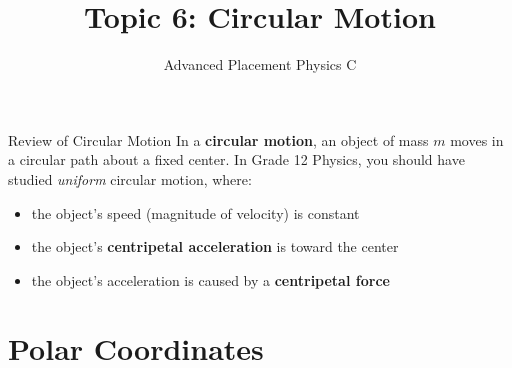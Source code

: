\documentclass[12pt,compress,aspectratio=169]{beamer}
\title{Topic 6: Circular Motion}
\subtitle{Advanced Placement Physics C}
\begin{document}
\begin{frame}
  \maketitle
\end{frame}



\begin{frame}{Review of Circular Motion}
  In a \textbf{circular motion}, an object of mass $m$ moves in a circular path
  about a fixed center. In Grade 12 Physics, you should have studied
  \emph{uniform} circular motion, where:
  \begin{itemize}
  \item the object's speed (magnitude of velocity) is constant
  \item the object's \textbf{centripetal acceleration} is toward the center
  \item the object's acceleration is caused by a \textbf{centripetal force}
  \end{itemize}
\end{frame}



\section{Polar Coordinates}
\end{document}
